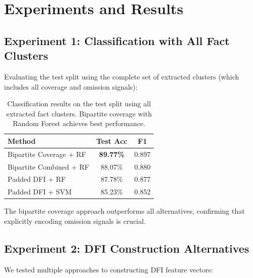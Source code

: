 \documentclass[11pt]{article}
\begin{document}
\section{Experiments and Results}

\subsection{Experiment 1: Classification with All Fact Clusters}

Evaluating the test split using the complete set of extracted clusters (which includes all coverage and omission signals):

\begin{table}[h]
\centering
\begin{tabular}{lcc}
\toprule
\textbf{Method} & \textbf{Test Acc} & \textbf{F1} \\
\midrule
Bipartite Coverage + RF & \textbf{89.77\%} & 0.897 \\
Bipartite Combined + RF & 88.07\% & 0.880 \\
Padded DFI + RF & 87.78\% & 0.877 \\
Padded DFI + SVM & 85.23\% & 0.852 \\
\bottomrule
\end{tabular}
\caption{Classification results on the test split using all extracted fact clusters. Bipartite coverage with Random Forest achieves best performance.}
\label{tab:full-results}
\end{table}

The bipartite coverage approach outperforms all alternatives, confirming that explicitly encoding omission signals is crucial.

\subsection{Experiment 2: DFI Construction Alternatives}
\label{sec:dfi-alternatives}

We tested multiple approaches to constructing DFI feature vectors:
\end{document}

